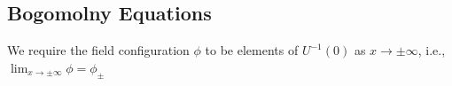\documentclass[a4paper,11pt]{article}
\begin{document}
    





    
    \subsection{Bogomolny Equations}
     We require the field configuration $\phi$ to be elements of $U^{-1}(0)$ as $x\to \pm \infty$, i.e., $\lim_{x \to \pm \infty} \phi = \phi_\pm$
    \begin{center}
        


\begin{tikzpicture}[x=0.75pt,y=0.75pt,yscale=-1,xscale=1]


\end{tikzpicture}
\end{center}
\end{document}
